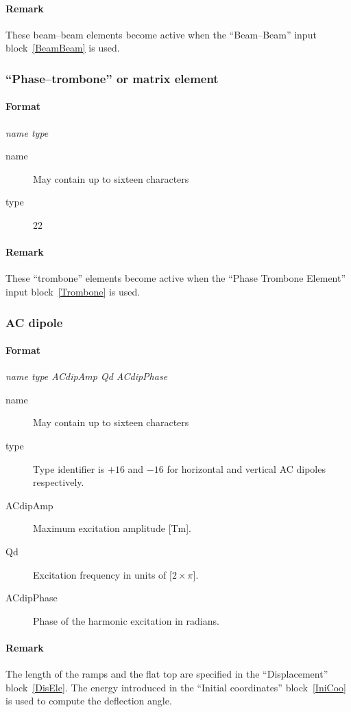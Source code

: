 \documentclass[a4paper,11pt]{report}
\begin{document}
\paragraph{Remark}
These beam--beam elements become active when the ``Beam--Beam'' input
block~\ref{BeamBeam} is used.

\subsubsection{``Phase--trombone'' or matrix element} \label{PT}
\paragraph{Format} {\em name type}
\begin{description}
\item [name] May contain up to sixteen characters
\item [type] 22
\end{description}

\paragraph{Remark}
These ``trombone'' elements become active when the
``Phase Trombone Element'' input block~\ref{Trombone} is used.

\subsubsection{AC dipole} \label{ACDIP}
\paragraph{Format} {\em name type ACdipAmp Qd ACdipPhase}
\begin{description}
\item [name] May contain up to sixteen characters
\item [type] Type identifier is $+16$ and $-16$ for horizontal and vertical
  AC dipoles respectively.
\item [ACdipAmp] Maximum excitation amplitude [Tm].
\item [Qd] Excitation frequency in units of [$2 \times \pi$]. 
\item [ACdipPhase] Phase of the harmonic excitation in radians.
\end{description}

\paragraph{Remark}
The length of the ramps and the flat top are specified in the
``Displacement'' block~\ref{DisEle}. The energy introduced in the
``Initial coordinates'' block~\ref{IniCoo} is used to compute the 
deflection angle.
\end{document}
